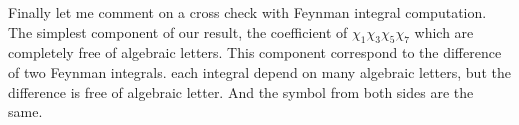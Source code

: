 \documentclass[a4paper,11pt]{article}
\begin{document}
Finally let me comment on a cross check with Feynman integral computation. The simplest component of our result, the coefficient of $\chi_{1}\chi_{3}\chi_{5}\chi_{7}$ which are completely free of algebraic letters. This component correspond to the difference of two Feynman integrals.  each integral  depend on many algebraic letters, but the difference is free of algebraic letter. And the symbol from both sides are the same.





\end{document}
